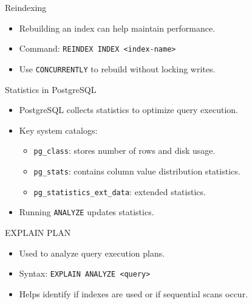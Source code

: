 \documentclass{beamer}
\begin{document}
\begin{frame}{Reindexing}
    \begin{itemize}
        \item Rebuilding an index can help maintain performance.
        \item Command: \texttt{REINDEX INDEX <index-name>}
        \item Use \texttt{CONCURRENTLY} to rebuild without locking writes.
    \end{itemize}
\end{frame}

\begin{frame}{Statistics in PostgreSQL}
    \begin{itemize}
        \item PostgreSQL collects statistics to optimize query execution.
        \item Key system catalogs:
        \begin{itemize}
            \item \texttt{pg\_class}: stores number of rows and disk usage.
            \item \texttt{pg\_stats}: contains column value distribution statistics.
            \item \texttt{pg\_statistics\_ext\_data}: extended statistics.
        \end{itemize}
        \item Running \texttt{ANALYZE} updates statistics.
    \end{itemize}
\end{frame}

\begin{frame}{EXPLAIN PLAN}
    \begin{itemize}
        \item Used to analyze query execution plans.
        \item Syntax: \texttt{EXPLAIN ANALYZE <query>}
        \item Helps identify if indexes are used or if sequential scans occur.
    \end{itemize}
\end{frame}
\end{document}
